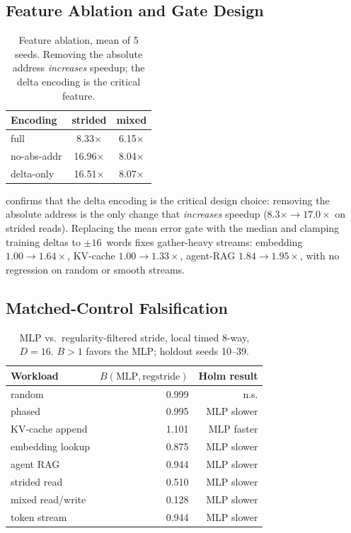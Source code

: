 \documentclass[sigplan,anonymous,review,nonacm]{acmart}
\begin{document}
\subsection{Feature Ablation and Gate Design}

\begin{table}[t]
\centering
\caption{Feature ablation, mean of 5 seeds. Removing the absolute address
\emph{increases} speedup; the delta encoding is the critical feature.}
\label{tab:ablation}
\begin{tabular}{@{}l cc@{}}
\toprule
Encoding & strided & mixed \\
\midrule
full          & 8.33$\times$  & 6.15$\times$ \\
no-abs-addr   & 16.96$\times$ & 8.04$\times$ \\
delta-only    & 16.51$\times$ & 8.07$\times$ \\
\bottomrule
\end{tabular}
\end{table}

 confirms that the delta encoding is the critical design
choice: removing the absolute address is the only change that
\emph{increases} speedup ($8.3\times \to 17.0\times$ on strided reads).
Replacing the mean error gate with the median and clamping training deltas
to ${\pm}16$~words fixes gather-heavy streams: embedding
$1.00 \to 1.64\times$, KV-cache $1.00 \to 1.33\times$, agent-RAG
$1.84 \to 1.95\times$, with no regression on random or smooth streams.

\subsection{Matched-Control Falsification}
\label{sec:falsification}

\begin{table}[t]
\centering
\caption{MLP vs.\ regularity-filtered stride, local timed 8-way, $D=16$.
$B > 1$ favors the MLP; holdout seeds 10--39.}
\label{tab:matched}
\begin{tabular}{@{}l rr@{}}
\toprule
Workload & $B(\text{MLP}, \text{regstride})$ & Holm result \\
\midrule
random             & 0.999 & n.s. \\
phased             & 0.995 & MLP slower \\
KV-cache append    & 1.101 & MLP faster \\
embedding lookup   & 0.875 & MLP slower \\
agent RAG          & 0.944 & MLP slower \\
strided read       & 0.510 & MLP slower \\
mixed read/write   & 0.128 & MLP slower \\
token stream       & 0.944 & MLP slower \\
\bottomrule
\end{tabular}
\end{table}
\end{document}
